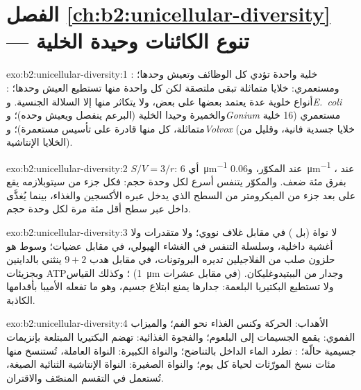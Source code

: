\section*{الفصل \ref{ch:b2:unicellular-diversity} --- تنوع الكائنات وحيدة الخلية}

\begin{solution}{exo:b2:unicellular-diversity:1}
: خلية واحدة تؤدي كل الوظائف وتعيش وحدها؛ ومستعمري:
خلايا متماثلة تبقى ملتصقة لكن كل واحدة منها تستطيع العيش وحدها؛
: أنواع خلوية عدة يعتمد بعضها على بعض، ولا يتكاثر منها
إلا السلالة الجنسية. و\emph{E.~coli} والخميرة وحيدا الخلية (البرعم
ينفصل ويعيش وحده)؛ و\emph{Gonium} مستعمري (16 خلية متماثلة، كل
منها قادرة على تأسيس مستعمرة)؛ و\emph{Volvox}  (خلايا
جسدية فانية، وقليل من الخلايا الإنتاشية).
\end{solution}

\begin{solution}{exo:b2:unicellular-diversity:2}
$S/V = 3/r$: أي \qty{6}{\micro m^{-1}} عند المكوّر،
و\qty{0.06}{\micro m^{-1}} عند ، بفرق مئة ضعف. والمكوّر
يتنفس أسرع لكل وحدة حجم: فكل جزء من سيتوبلازمه يقع على بعد جزء من
الميكرومتر من السطح الذي يدخل عبره الأكسجين والغذاء، بينما يُغذَّى
داخل  عبر سطح أقل مئة مرة لكل وحدة حجم.
\end{solution}

\begin{solution}{exo:b2:unicellular-diversity:3}
لا نواة (بل ) في مقابل غلاف نووي؛ ولا متقدرات ولا أغشية
داخلية، وسلسلة التنفس في الغشاء الهيولي، في مقابل عضيات؛ وسوط هو
حلزون صلب من الفلاجيلين تديره البروتونات، في مقابل هدب $9+2$
ينثني بالداينين وبجزيئات ATP؛ وكذلك القياس (\qty{1}{\micro m} في
مقابل عشرات) وجدار من الببتيدوغليكان. ولا تستطيع البكتيريا البلعمة:
جدارها يمنع ابتلاع جسيم، وهو ما تفعله الأميبا بأقدامها الكاذبة.
\end{solution}

\begin{solution}{exo:b2:unicellular-diversity:4}
الأهداب: الحركة وكنس الغذاء نحو الفم؛ والميزاب الفموي: يقمع
الجسيمات إلى البلعوم؛ والفجوة الغذائية: تهضم البكتيريا المبتلعة
بإنزيمات جسيمية حالّة؛ : تطرد الماء الداخل
بالتناضح؛ والنواة الكبيرة: النواة العاملة، تُستنسخ منها مئات نسخ
المورّثات لحياة كل يوم؛ والنواة الصغيرة: النواة الإنتاشية الثنائية
الصيغة، تُستعمل في التقسم المنصّف والاقتران.
\end{solution}


